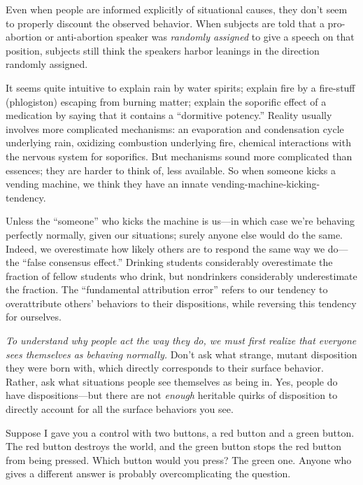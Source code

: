 {
 Even when people are informed explicitly of situational causes,
they don't seem to properly discount the observed
behavior. When subjects are told that a pro-abortion or anti-abortion
speaker was \textit{randomly assigned} to give a speech on that
position, subjects still think the speakers harbor leanings in the
direction randomly assigned.}

{
 It seems quite intuitive to explain rain by water spirits; explain
fire by a fire-stuff (phlogiston) escaping from burning matter; explain
the soporific effect of a medication by saying that it contains a
``dormitive potency.'' Reality
usually involves more complicated mechanisms: an evaporation and
condensation cycle underlying rain, oxidizing combustion underlying
fire, chemical interactions with the nervous system for soporifics. But
mechanisms sound more complicated than essences; they are harder to
think of, less available. So when someone kicks a vending machine, we
think they have an innate vending-machine-kicking-tendency.}

{
 Unless the ``someone'' who
kicks the machine is us---in which case we're behaving
perfectly normally, given our situations; surely anyone else would do
the same. Indeed, we overestimate how likely others are to respond the
same way we do---the ``false consensus
effect.'' Drinking students considerably overestimate
the fraction of fellow students who drink, but nondrinkers considerably
underestimate the fraction. The ``fundamental
attribution error'' refers to our tendency to
overattribute others' behaviors to their dispositions,
while reversing this tendency for ourselves.}

{
 \textit{To understand why people act the way they do, we must
first realize that everyone sees themselves as behaving normally.}
Don't ask what strange, mutant disposition they were
born with, which directly corresponds to their surface behavior.
Rather, ask what situations people see themselves as being in. Yes,
people do have dispositions---but there are not \textit{enough}
heritable quirks of disposition to directly account for all the surface
behaviors you see.}

{
 Suppose I gave you a control with two buttons, a red button and a
green button. The red button destroys the world, and the green button
stops the red button from being pressed. Which button would you press?
The green one. Anyone who gives a different answer is probably
overcomplicating the question.}

